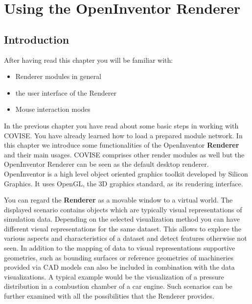 
\begin{htmlonly}

\end{htmlonly}


\startdocument
\chapter{Using the OpenInventor Renderer}
\label{Using_the_Renderer}

\section{Introduction}

After having read this chapter you will be familiar with: 

\begin{itemize}
\item Renderer modules in general 
\item the user interface of the Renderer 
\item Mouse interaction modes
\end{itemize}


In the previous chapter you have read about some basic steps in working with COVISE. 
You have already learned how to load a prepared module network. In this chapter we 
introduce some functionalities of the OpenInventor {\bf Renderer} and their main usages. 
COVISE comprises other render modules as well but the OpenInventor Renderer can be seen
as the default desktop renderer. OpenInventor is a high level object oriented graphics 
toolkit developed by Silicon Graphics. It uses OpenGL, the 3D graphics standard, as its 
rendering interface. 

You can regard the {\bf Renderer} as a movable window to a virtual world. The displayed 
scenario contains objects which are typically visual representations of simulation data. 
Depending on the selected visualization method you can have different visual representations 
for the same dataset. This allows to explore the various aspects and characteristics of
a dataset and detect features otherwise not seen. In addition to the mapping of data to 
visual representations supportive geometries, such as bounding surfaces or reference 
geometries of machineries provided via CAD models can also be included in combination with 
the data visualizations. A typical example would be the visualization of a pressure 
distribution in a combustion chamber of a car engine. Such scenarios can be further 
examined with all the possibilities that the Renderer provides. 


